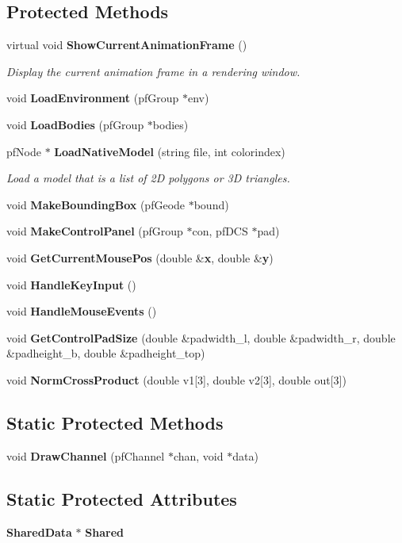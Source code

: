 \subsection*{Protected Methods}
\begin{CompactItemize}
\item 
virtual void {\bf Show\-Current\-Animation\-Frame} ()
\begin{CompactList}\small\item\em Display the current animation frame in a rendering window.\item\end{CompactList}\item 
void {\bf Load\-Environment} (pf\-Group $\ast$env)
\item 
void {\bf Load\-Bodies} (pf\-Group $\ast$bodies)
\item 
pf\-Node $\ast$ {\bf Load\-Native\-Model} (string file, int colorindex)
\begin{CompactList}\small\item\em Load a model that is a list of 2D polygons or 3D triangles.\item\end{CompactList}\item 
void {\bf Make\-Bounding\-Box} (pf\-Geode $\ast$bound)
\item 
void {\bf Make\-Control\-Panel} (pf\-Group $\ast$con, pf\-DCS $\ast$pad)
\item 
void {\bf Get\-Current\-Mouse\-Pos} (double \&{\bf x}, double \&{\bf y})
\item 
void {\bf Handle\-Key\-Input} ()
\item 
void {\bf Handle\-Mouse\-Events} ()
\item 
void {\bf Get\-Control\-Pad\-Size} (double \&padwidth\_\-l, double \&padwidth\_\-r, double \&padheight\_\-b, double \&padheight\_\-top)
\item 
void {\bf Norm\-Cross\-Product} (double v1[3], double v2[3], double out[3])
\end{CompactItemize}
\subsection*{Static Protected Methods}
\begin{CompactItemize}
\item 
void {\bf Draw\-Channel} (pf\-Channel $\ast$chan, void $\ast$data)
\end{CompactItemize}
\subsection*{Static Protected Attributes}
\begin{CompactItemize}
\item 
{\bf Shared\-Data} $\ast$ {\bf Shared}
\end{CompactItemize}


